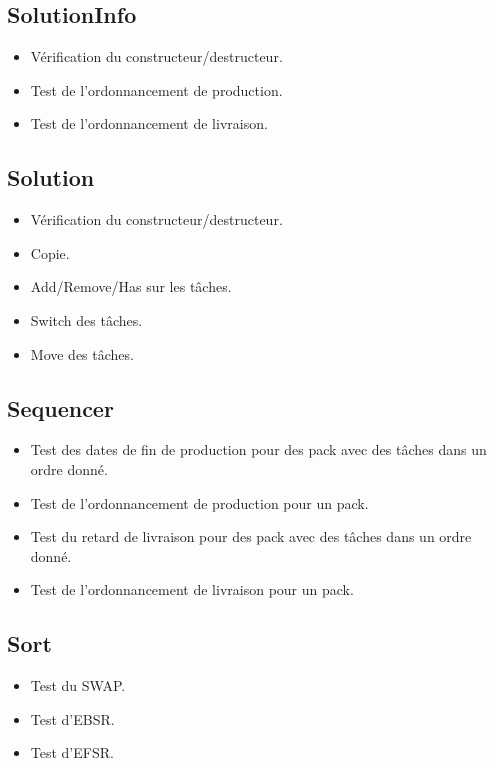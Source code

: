 \documentclass[hideweeklyreports]{polytech/polytech}
\begin{document}
			\subsection{SolutionInfo}
				\begin{itemize}
					\item Vérification du constructeur/destructeur.
					\item Test de l'ordonnancement de production.
					\item Test de l'ordonnancement de livraison.
				\end{itemize}
				
			\subsection{Solution}
				\begin{itemize}
					\item Vérification du constructeur/destructeur.
					\item Copie.
					\item Add/Remove/Has sur les tâches.
					\item Switch des tâches.
					\item Move des tâches.
				\end{itemize}
				
			\subsection{Sequencer}
				\begin{itemize}
					\item Test des dates de fin de production pour des pack avec des tâches dans un ordre donné.
					\item Test de l'ordonnancement de production pour un pack.
					\item Test du retard de livraison pour des pack avec des tâches dans un ordre donné.
					\item Test de l'ordonnancement de livraison pour un pack.
				\end{itemize}
				
			\subsection{Sort}
				\begin{itemize}
					\item Test du SWAP.
					\item Test d'EBSR.
					\item Test d'EFSR.
				\end{itemize}
				
\end{document}
